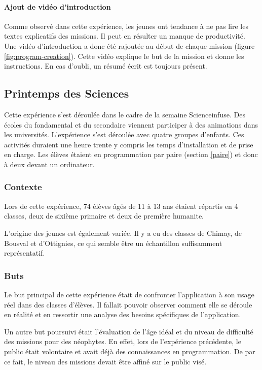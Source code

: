 \paragraph{Ajout de vidéo d'introduction}
Comme observé dans cette expérience, les jeunes ont tendance à ne pas lire les textes explicatifs des \glspl{mission}. Il peut en résulter un manque de productivité. Une vidéo d'introduction a donc été rajoutée au début de chaque \gls{mission} (figure \ref{fig:program-creation}). Cette vidéo explique le but de la \gls{mission} et donne les instructions. En cas d'oubli, un résumé écrit est toujours présent.

\subsection{Printemps des Sciences}
Cette expérience s'est déroulée dans le cadre de la semaine Scienceinfuse. Des écoles du \gls{fondamental} et du \gls{secondaire} viennent participer à des animations dans les universités. L'expérience s'est déroulée avec quatre groupes d'enfants. Ces activités duraient une heure trente y compris les temps d'installation et de prise en charge. Les élèves étaient en programmation par paire (section \ref{paire}) et donc à deux devant un ordinateur.

\subsubsection{Contexte}
Lors de cette expérience, 74 élèves âgés de 11 à 13 ans étaient répartis en 4 classes, deux de sixième \gls{primaire} et deux de première \gls{humanite}.

L'origine des jeunes est également variée. Il y a eu des classes de Chimay, de Bousval et d'Ottignies, ce qui semble être un échantillon suffisamment représentatif.

\subsubsection{Buts}
Le but principal de cette expérience était de confronter l'application à son usage réel dans des classes d'élèves. Il fallait pouvoir observer comment elle se déroule en réalité et en ressortir une analyse des besoins spécifiques de l'application.

Un autre but poursuivi était l'évaluation de l'âge idéal et du niveau de difficulté des \glspl{mission} pour des néophytes. En effet, lors de l'expérience précédente, le public était volontaire et avait déjà des connaissances en programmation. De par ce fait, le niveau des \glspl{mission} devait être affiné sur le public visé.

